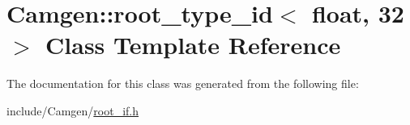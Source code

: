 \hypertarget{a00474}{\section{Camgen\-:\-:root\-\_\-type\-\_\-id$<$ float, 32 $>$ Class Template Reference}
\label{a00474}
}


The documentation for this class was generated from the following file\-:\begin{DoxyCompactItemize}
\item 
include/\-Camgen/\hyperlink{a00732}{root\-\_\-if.\-h}\end{DoxyCompactItemize}
